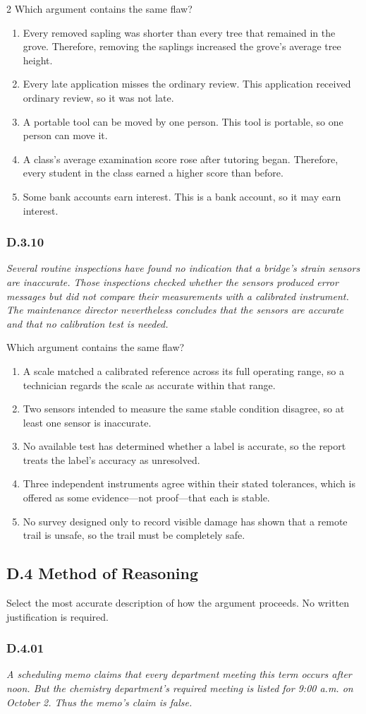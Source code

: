 \documentclass[10pt]{extarticle}
\newcommand{\choice}[1]{\item #1}
\newcommand{\bankitem}[1]{\subsubsection*{#1}}
\begin{document}
\begin{multicols}{2}
Which argument contains the same flaw?
\begin{enumerate}[label=(\alph*)]
  \choice{Every removed sapling was shorter than every tree that remained in the grove. Therefore, removing the saplings increased the grove's average tree height.}
  \choice{Every late application misses the ordinary review. This application received ordinary review, so it was not late.}
  \choice{A portable tool can be moved by one person. This tool is portable, so one person can move it.}
  \choice{A class's average examination score rose after tutoring began. Therefore, every student in the class earned a higher score than before.}
  \choice{Some bank accounts earn interest. This is a bank account, so it may earn interest.}
\end{enumerate}
\bankitem{D.3.10}
\emph{Several routine inspections have found no indication that a bridge's strain sensors are inaccurate. Those inspections checked whether the sensors produced error messages but did not compare their measurements with a calibrated instrument. The maintenance director nevertheless concludes that the sensors are accurate and that no calibration test is needed.}

Which argument contains the same flaw?
\begin{enumerate}[label=(\alph*)]
  \choice{A scale matched a calibrated reference across its full operating range, so a technician regards the scale as accurate within that range.}
  \choice{Two sensors intended to measure the same stable condition disagree, so at least one sensor is inaccurate.}
  \choice{No available test has determined whether a label is accurate, so the report treats the label's accuracy as unresolved.}
  \choice{Three independent instruments agree within their stated tolerances, which is offered as some evidence---not proof---that each is stable.}
  \choice{No survey designed only to record visible damage has shown that a remote trail is unsafe, so the trail must be completely safe.}
\end{enumerate}
\subsection*{D.4 Method of Reasoning}
Select the most accurate description of how the argument proceeds. No written justification is required.
\bankitem{D.4.01}
\emph{A scheduling memo claims that every department meeting this term occurs after noon. But the chemistry department's required meeting is listed for 9:00 a.m. on October 2. Thus the memo's claim is false.}


\end{multicols}
\end{document}

